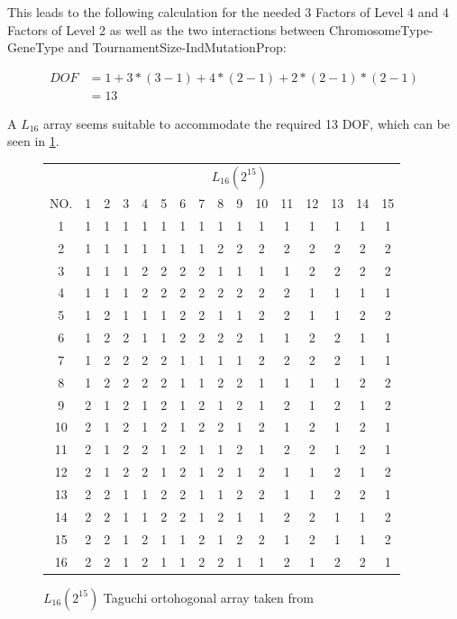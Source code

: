 This leads to the following calculation for the needed 3 Factors of Level 4 and 4 Factors of Level 2 as well as the two interactions between ChromosomeType-GeneType and TournamentSize-IndMutationProp:

\begin{equation} \label{DOF}
	\begin{split}
		DOF & = 1 + 3 * (3 - 1) + 4 * (2 - 1) + 2 * (2 - 1) * (2 - 1) \\
		& = 13
	\end{split}
\end{equation}

A $L_{16}$ array seems suitable to accommodate the required 13 DOF, which can be seen in \ref{table:hyperparameter_tuning:L16_orhtogonal_array}.


\begin{figure}[ht]
	\centering
\begin{tabular}{ |c||c|c|c|c|c|c|c|c|c|c|c|c|c|c|c|  }
	\hline
	   & \multicolumn{15}{|c|}{ $L_{16}(2^{15})$ } \\
	NO.& 1 & 2 & 3 & 4 & 5 & 6 & 7 & 8 & 9 & 10& 11& 12& 13& 14&15\\
	\hline
	1  & 1 & 1 & 1 & 1 & 1 & 1 & 1 & 1 & 1 & 1 & 1 & 1 & 1 & 1 & 1\\
	2  & 1 & 1 & 1 & 1 & 1 & 1 & 1 & 2 & 2 & 2 & 2 & 2 & 2 & 2 & 2\\
	3  & 1 & 1 & 1 & 2 & 2 & 2 & 2 & 1 & 1 & 1 & 1 & 2 & 2 & 2 & 2\\
	4  & 1 & 1 & 1 & 2 & 2 & 2 & 2 & 2 & 2 & 2 & 2 & 1 & 1 & 1 & 1\\
	5  & 1 & 2 & 1 & 1 & 1 & 2 & 2 & 1 & 1 & 2 & 2 & 1 & 1 & 2 & 2\\
	6  & 1 & 2 & 2 & 1 & 1 & 2 & 2 & 2 & 2 & 1 & 1 & 2 & 2 & 1 & 1\\
	7  & 1 & 2 & 2 & 2 & 2 & 1 & 1 & 1 & 1 & 2 & 2 & 2 & 2 & 1 & 1\\
	8  & 1 & 2 & 2 & 2 & 2 & 1 & 1 & 2 & 2 & 1 & 1 & 1 & 1 & 2 & 2\\
	9  & 2 & 1 & 2 & 1 & 2 & 1 & 2 & 1 & 2 & 1 & 2 & 1 & 2 & 1 & 2\\
	10 & 2 & 1 & 2 & 1 & 2 & 1 & 2 & 2 & 1 & 2 & 1 & 2 & 1 & 2 & 1\\
	11 & 2 & 1 & 2 & 2 & 1 & 2 & 1 & 1 & 2 & 1 & 2 & 2 & 1 & 2 & 1\\
	12 & 2 & 1 & 2 & 2 & 1 & 2 & 1 & 2 & 1 & 2 & 1 & 1 & 2 & 1 & 2\\
	13 & 2 & 2 & 1 & 1 & 2 & 2 & 1 & 1 & 2 & 2 & 1 & 1 & 2 & 2 & 1\\
	14 & 2 & 2 & 1 & 1 & 2 & 2 & 1 & 2 & 1 & 1 & 2 & 2 & 1 & 1 & 2\\
	15 & 2 & 2 & 1 & 2 & 1 & 1 & 2 & 1 & 2 & 2 & 1 & 2 & 1 & 1 & 2\\
	16 & 2 & 2 & 1 & 2 & 1 & 1 & 2 & 2 & 1 & 1 & 2 & 1 & 2 & 2 & 1\\
	\hline
\end{tabular}
\label{table:hyperparameter_tuning:L16_orhtogonal_array}
\caption{ $L_{16}(2^{15})$ Taguchi ortohogonal array taken from \cite{roy_primer_1990}}
\end{figure}


